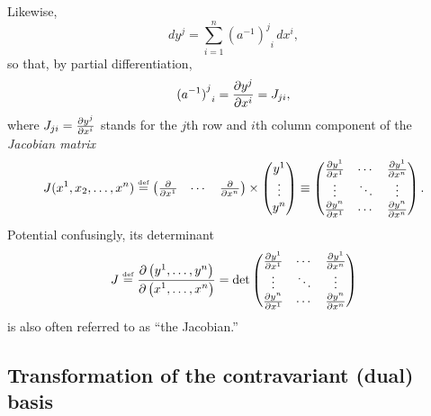 Likewise,
\begin{equation}
d{ y }^j   =
\sum_{i=1}^n {{({a^{-1}})}^j}_i\, d{x}^i,
\end{equation}
so that, by partial differentiation,
\begin{equation}
{{(a^{-1})}^j}_i =
{\partial { y }^j \over \partial x^i}   =J_{ji},
\label{2001-mu-tensor-tl2nl}
\end{equation}
where $J_{ji} = {\partial { y }^j\over \partial {x}^i}$ stands for
the $j$th row and $i$th column component of the {\em Jacobian matrix}
\begin{equation}
J(x^1,x_2,\ldots ,x^n)
\stackrel{{\text{\tiny def}}}{=}
\begin{pmatrix}
\frac{\partial }{\partial { x }^1}&\cdots&\frac{\partial }{\partial {x}^n}
\end{pmatrix}
\times
\begin{pmatrix}
y^1\\
\vdots\\
y^n
\end{pmatrix}
\equiv
\begin{pmatrix}
{\partial { y }^1\over \partial {x}^1}&\cdots&{\partial { y }^1\over \partial {x}^n}\\
\vdots&\ddots &\vdots\\
{\partial { y }^n\over \partial {x}^1}&\cdots&{\partial { y }^n\over \partial {x}^n}
\end{pmatrix}
.
\label{2013-m-t-jm}
\end{equation}
Potential confusingly,
its determinant
\begin{equation}
J \stackrel{{\text{\tiny def}}}{=}
\frac{
\partial \begin{pmatrix}y^1, \ldots , y^n \end{pmatrix}
}
{
\partial \begin{pmatrix} x^1, \ldots , x^n \end{pmatrix}
}
=
\text{det}
\begin{pmatrix}
{\partial { y }^1\over \partial {x}^1}&\cdots&{\partial { y }^1\over \partial {x}^n}\\
\vdots&\ddots &\vdots\\
{\partial { y }^n\over \partial {x}^1}&\cdots&{\partial { y }^n\over \partial {x}^n}
\end{pmatrix}
\label{2018-mm-t-jd}
\end{equation}
is also often referred to as ``the Jacobian.''


\subsection{Transformation of the contravariant (dual) basis}

